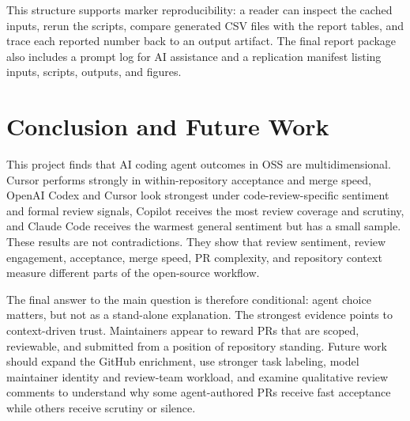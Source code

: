 \documentclass[sigconf,nonacm]{acmart}
\begin{document}
This structure supports marker reproducibility: a reader can inspect the cached inputs, rerun the scripts, compare generated CSV files with the report tables, and trace each reported number back to an output artifact. The final report package also includes a prompt log for AI assistance and a replication manifest listing inputs, scripts, outputs, and figures.

\FloatBarrier
\section{Conclusion and Future Work}

This project finds that AI coding agent outcomes in OSS are multidimensional. Cursor performs strongly in within-repository acceptance and merge speed, OpenAI Codex and Cursor look strongest under code-review-specific sentiment and formal review signals, Copilot receives the most review coverage and scrutiny, and Claude Code receives the warmest general sentiment but has a small sample. These results are not contradictions. They show that review sentiment, review engagement, acceptance, merge speed, PR complexity, and repository context measure different parts of the open-source workflow.

The final answer to the main question is therefore conditional: agent choice matters, but not as a stand-alone explanation. The strongest evidence points to context-driven trust. Maintainers appear to reward PRs that are scoped, reviewable, and submitted from a position of repository standing. Future work should expand the GitHub enrichment, use stronger task labeling, model maintainer identity and review-team workload, and examine qualitative review comments to understand why some agent-authored PRs receive fast acceptance while others receive scrutiny or silence.
\end{document}

